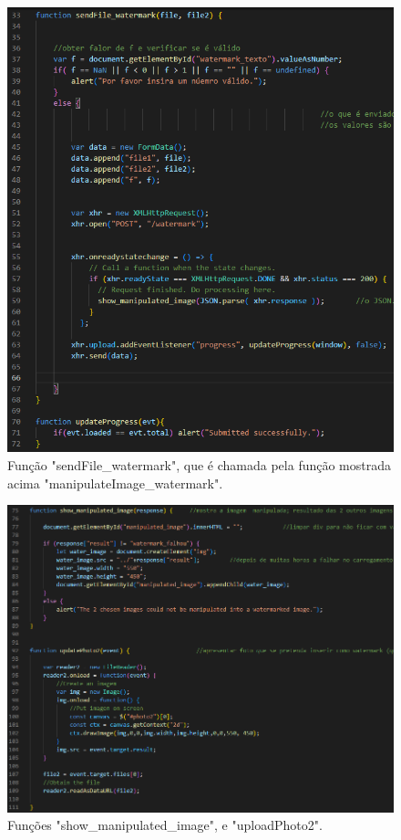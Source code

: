 \documentclass{report}
\begin{document}
\begin{figure}[!hbtp]
        \centering
        \includegraphics[scale=0.81]{Images_code/12 - image manipulation js watermark sendfile_watermark.png}
        \caption{\label{Estrutura}Função "sendFile\_watermark", que é chamada pela função mostrada acima "manipulateImage\_watermark".}
\end{figure}


\newpage

\begin{figure}[!hbtp]
        \centering
        \includegraphics[scale=0.6]{Images_code/12 - image manipulation js watermark showmanipulatedImage e updatePhoto2.png}
        \caption{\label{Estrutura}Funções "show\_manipulated\_image", e "uploadPhoto2".}
\end{figure}
\end{document}
